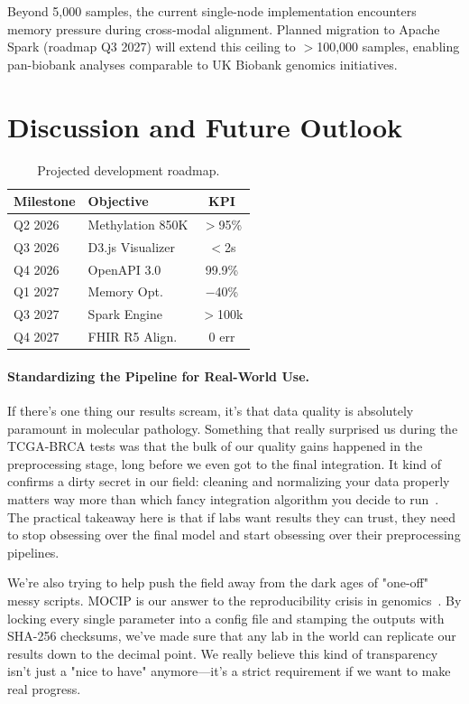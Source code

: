 \documentclass[runningheads]{llncs}
\begin{document}
Beyond 5,000 samples, the current single-node implementation encounters memory pressure during cross-modal alignment. Planned migration to Apache Spark (roadmap Q3 2027) will extend this ceiling to $>$100,000 samples, enabling pan-biobank analyses comparable to UK Biobank genomics initiatives.

\section{Discussion and Future Outlook}

\begin{table}[H]
\caption{Projected development roadmap.}\label{tab:roadmap}
\centering
\small
\setlength{\tabcolsep}{3pt}
\begin{tabular}{l l c}
\toprule
\textbf{Milestone} & \textbf{Objective} & \textbf{KPI} \\
\midrule
Q2 2026 & Methylation 850K & $>$95\% \\
Q3 2026 & D3.js Visualizer & $<$2s \\
Q4 2026 & OpenAPI 3.0 & 99.9\% \\
Q1 2027 & Memory Opt. & $-$40\% \\
Q3 2027 & Spark Engine & $>$100k \\
Q4 2027 & FHIR R5 Align. & 0 err \\
\bottomrule
\end{tabular}
\end{table}

\paragraph{Standardizing the Pipeline for Real-World Use.}
If there's one thing our results scream, it's that data quality is absolutely paramount in molecular pathology. Something that really surprised us during the TCGA-BRCA tests was that the bulk of our quality gains happened in the preprocessing stage, long before we even got to the final integration. It kind of confirms a dirty secret in our field: cleaning and normalizing your data properly matters way more than which fancy integration algorithm you decide to run~\cite{krassowski2020}. The practical takeaway here is that if labs want results they can trust, they need to stop obsessing over the final model and start obsessing over their preprocessing pipelines.



We're also trying to help push the field away from the dark ages of "one-off" messy scripts. MOCIP is our answer to the reproducibility crisis in genomics~\cite{wilkinson2016}. By locking every single parameter into a config file and stamping the outputs with SHA-256 checksums, we've made sure that any lab in the world can replicate our results down to the decimal point. We really believe this kind of transparency isn't just a "nice to have" anymore---it's a strict requirement if we want to make real progress.
\end{document}
